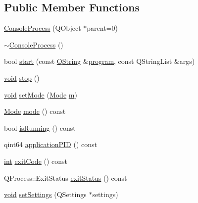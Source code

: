 \subsection*{Public Member Functions}
\begin{DoxyCompactItemize}
\item 
\hyperlink{class_utils_1_1_console_process_af12bb9d4a8da527e9af245c4bac14e01}{Console\-Process} (Q\-Object $\ast$parent=0)
\item 
\hyperlink{class_utils_1_1_console_process_aa05892f0066ec865160ea3a4944151c7}{$\sim$\-Console\-Process} ()
\item 
bool \hyperlink{class_utils_1_1_console_process_a882d1caae03faaa2b9e2ad7edab2d68a}{start} (const \hyperlink{group___u_a_v_objects_plugin_gab9d252f49c333c94a72f97ce3105a32d}{Q\-String} \&\hyperlink{glext_8h_ab55c179cd6c84b3f5ddc11d9da0f55b4}{program}, const Q\-String\-List \&args)
\item 
\hyperlink{group___u_a_v_objects_plugin_ga444cf2ff3f0ecbe028adce838d373f5c}{void} \hyperlink{class_utils_1_1_console_process_a15dd3ed04029a5899bdbc84e64a9bb09}{stop} ()
\item 
\hyperlink{group___u_a_v_objects_plugin_ga444cf2ff3f0ecbe028adce838d373f5c}{void} \hyperlink{class_utils_1_1_console_process_af221c5c6a26a6286ae5a0bbfcf094b1b}{set\-Mode} (\hyperlink{class_utils_1_1_console_process_a6c86a313e133158cd77772a207426e41}{Mode} \hyperlink{glext_8h_af593500c283bf1a787a6f947f503a5c2}{m})
\item 
\hyperlink{class_utils_1_1_console_process_a6c86a313e133158cd77772a207426e41}{Mode} \hyperlink{class_utils_1_1_console_process_a697ed590a6d3fad5eca1258b7e9fd56b}{mode} () const 
\item 
bool \hyperlink{class_utils_1_1_console_process_ab3a478c30db598118ce83987d79c0cac}{is\-Running} () const 
\item 
qint64 \hyperlink{class_utils_1_1_console_process_a8b7e361cd1605e2127ca63d1d9fa6118}{application\-P\-I\-D} () const 
\item 
\hyperlink{ioapi_8h_a787fa3cf048117ba7123753c1e74fcd6}{int} \hyperlink{class_utils_1_1_console_process_abce142102a6c34221a78b1909edbdfa1}{exit\-Code} () const 
\item 
Q\-Process\-::\-Exit\-Status \hyperlink{class_utils_1_1_console_process_a6f7c21885bbae03bc2f4e315a31f8cce}{exit\-Status} () const 
\item 
\hyperlink{group___u_a_v_objects_plugin_ga444cf2ff3f0ecbe028adce838d373f5c}{void} \hyperlink{class_utils_1_1_console_process_a6450617efe1483c142de24f60fabc523}{set\-Settings} (Q\-Settings $\ast$settings)
\end{DoxyCompactItemize}
